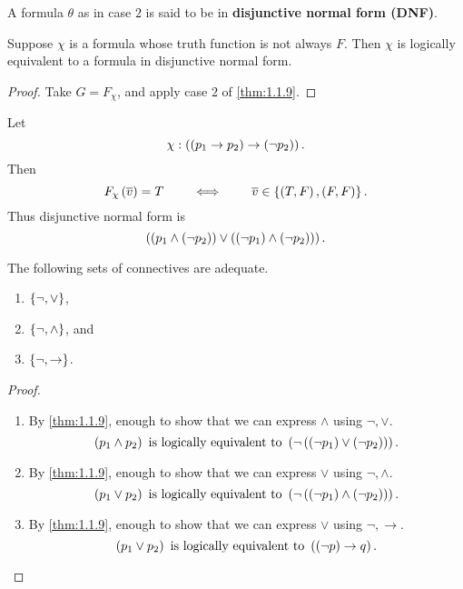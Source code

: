 A formula $ \theta $ as in case $ 2 $ is said to be in \textbf{disjunctive normal form (DNF)}.

\begin{corollary}
Suppose $ \chi $ is a formula whose truth function is not always $ F $. Then $ \chi $ is logically equivalent to a formula in disjunctive normal form.
\end{corollary}

\begin{proof}
Take $ G = F_\chi $, and apply case $ 2 $ of \ref{thm:1.1.9}.
\end{proof}

\begin{example*}
Let
$$ \chi : \left( \left( p_1 \rightarrow p_2 \right) \rightarrow \left( \neg p_2 \right) \right). $$
Then
$$ F_\chi\left( \overline{v} \right) = T \qquad \iff \qquad \overline{v} \in \left\{ \left( T, F \right), \left( F, F \right) \right\}. $$
Thus disjunctive normal form is
$$ \left( \left( p_1 \land \left( \neg p_2 \right) \right) \lor \left( \left( \neg p_1 \right) \land \left( \neg p_2 \right) \right) \right). $$
\end{example*}

\pagebreak

\begin{corollary}
The following sets of connectives are adequate.
\begin{enumerate}
\item $ \left\{ \neg, \lor \right\} $,
\item $ \left\{ \neg, \land \right\} $, and
\item $ \left\{ \neg, \rightarrow \right\} $.
\end{enumerate}
\end{corollary}

\begin{proof}
\hfill
\begin{enumerate}
\item By \ref{thm:1.1.9}, enough to show that we can express $ \land $ using $ \neg, \lor $.
$$ \left( p_1 \land p_2 \right) \ \text{is logically equivalent to} \ \left( \neg \left( \left( \neg p_1 \right) \lor \left( \neg p_2 \right) \right) \right). $$
\item By \ref{thm:1.1.9}, enough to show that we can express $ \lor $ using $ \neg, \land $.
$$ \left( p_1 \lor p_2 \right) \ \text{is logically equivalent to} \ \left( \neg \left( \left( \neg p_1 \right) \land \left( \neg p_2 \right) \right) \right). $$
\item By \ref{thm:1.1.9}, enough to show that we can express $ \lor $ using $ \neg, \rightarrow $.
$$ \left( p_1 \lor p_2 \right) \ \text{is logically equivalent to} \ \left( \left( \neg p \right) \rightarrow q \right). $$
\end{enumerate}
\end{proof}


